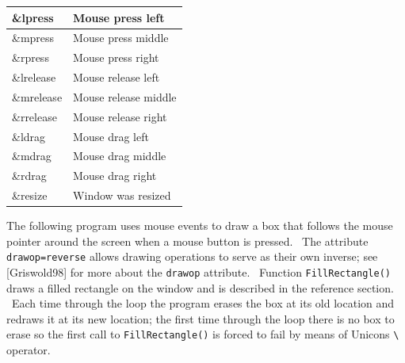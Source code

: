 \begin{center}
\begin{supertabular}{|m{0.9247598in}|m{2.3525598in}|}
\sffamily \&lpress &
Mouse press left\\\hline
\sffamily \&mpress &
Mouse press middle\\\hline
\sffamily \&rpress &
Mouse press right\\\hline
\sffamily \&lrelease &
Mouse release left\\\hline
\sffamily \&mrelease &
Mouse release middle\\\hline
\sffamily \&rrelease &
Mouse release right \\\hline
\sffamily \&ldrag &
Mouse drag left \\\hline
\sffamily \&mdrag &
Mouse drag middle \\\hline
\sffamily \&rdrag &
Mouse drag right \\\hline
\sffamily \&resize &
Window was resized \\\hline
\end{supertabular}
\end{center}
The following program uses mouse events to draw a box that follows the
mouse pointer around the screen when a mouse button is pressed. \ The
attribute \texttt{drawop=reverse} allows drawing operations to serve as
their own inverse; see [Griswold98] for more about the \texttt{drawop}
attribute. \ Function \texttt{FillRectangle()} draws a filled rectangle
on the window and is described in the reference section. \ Each time
through the loop the program erases the box at its old location and
redraws it at its new location; the first time through the loop there
is no box to erase so the first call to \texttt{FillRectangle()} is
forced to fail by means of Unicon{\textquotesingle}s
\texttt{{\textbackslash}} operator.


